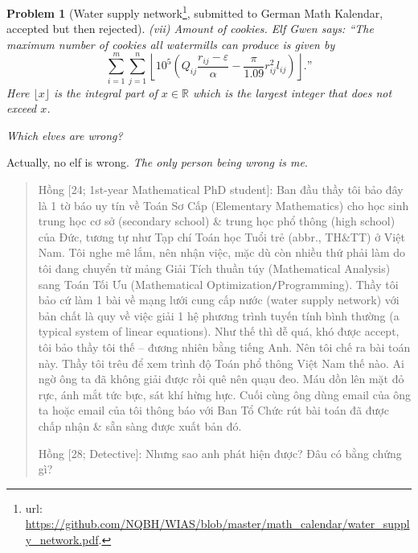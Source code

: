 \documentclass[12pt]{article}
\newtheorem{problem}{Problem}
\begin{document}
\begin{problem}[Water supply network\footnote{{\sc url}: \url{https://github.com/NQBH/WIAS/blob/master/math_calendar/water_supply_network.pdf}.}, submitted to German {\sc Math Kalendar}, accepted but then rejected]
	\item(vii) {\sf Amount of cookies.} Elf Gwen says: ``The maximum number of cookies all watermills can produce is given by
	\begin{equation*}
		\sum_{i = 1}^m\sum_{j = 1}^n \left\lfloor10^5\left(Q_{ij}\frac{r_{ij} - \varepsilon}{\alpha} - \frac{\pi}{1.09}r_{ij}^2l_{ij}\right)\right\rfloor.\mbox{''}
	\end{equation*}
	Here $\lfloor x\rfloor$ is the \emph{integral part} of $x\in\mathbb{R}$ which is the largest integer that does not exceed $x$.
	
	Which elves are wrong?
\end{problem}
Actually, no elf is wrong. {\it The only person being wrong is me}.

\begin{quote}
	{\sf Hồng [24; 1st-year Mathematical PhD student]}: Ban đầu thầy tôi bảo đây là 1 tờ báo uy tín về Toán Sơ Cấp (Elementary Mathematics) cho học sinh trung học cơ sở (secondary school) \& trung học phổ thông (high school) của Đức, tương tự như Tạp chí Toán học Tuổi trẻ (abbr., TH\&TT) ở Việt Nam. Tôi nghe mê lắm, nên nhận việc, mặc dù còn nhiều thứ phải làm do tôi đang chuyển từ mảng Giải Tích thuần túy (Mathematical Analysis) sang Toán Tối Ưu (Mathematical Optimization{\tt/}Programming). Thầy tôi bảo cứ làm 1 bài về mạng lưới cung cấp nước (water supply network) với bản chất là quy về việc giải 1 hệ phương trình tuyến tính bình thường (a typical system of linear equations). Như thế thì dễ quá, khó được accept, tôi bảo thầy tôi thế -- đương nhiên bằng tiếng Anh. Nên tôi chế ra bài toán này. Thầy tôi trêu để xem trình độ Toán phổ thông Việt Nam thế nào. Ai ngờ ông ta đã không giải được rồi quê nên quạu đeo. Máu dồn lên mặt đỏ rực, ánh mắt tức bực, sát khí hừng hực. Cuối cùng ông dùng email của ông ta hoặc email của tôi thông báo với Ban Tổ Chức rút bài toán đã được chấp nhận \& sẵn sàng được xuất bản đó.
	
	{\sf Hồng [28; Detective]}: Nhưng sao anh phát hiện được? Đâu có bằng chứng gì?
	

\end{quote}
\end{document}
